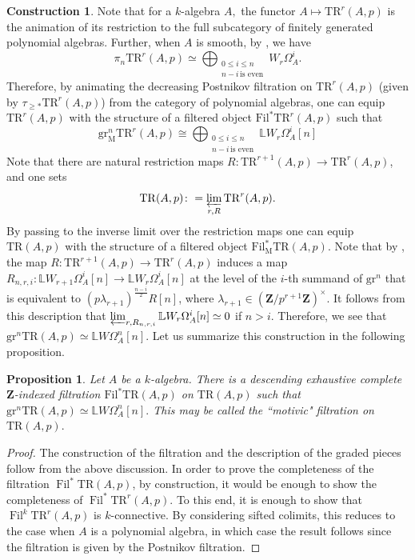 \documentclass[10pt,letterpaper]{amsart}
\numberwithin{figure}{section}
\numberwithin{equation}{section}
\newtheorem{proposition}[figure]{Proposition}
\theoremstyle{definition}
\theoremstyle{definition}
\theoremstyle{definition}
\theoremstyle{definition}
\newtheorem{construction}[figure]{Construction}
\DeclareMathOperator{\Fil}{Fil}
\newcommand{\w}{\text}
\newcommand{\TR}{\mathrm{TR}}
\renewcommand{\L}{\mathbb{L}}
\newcommand{\Z}{\mathbf{Z}}
\begin{document}
\begin{construction}\label{cons1}
    Note that for a $k$-algebra $A,$ the functor $A \mapsto \TR ^r (A,p)$ is the animation of its restriction to the full subcategory of finitely generated polynomial algebras. Further, when $A$ is smooth, by \cite[Thm.~B]{Hess}, we have
$$\pi_n \TR^r(A,p) \simeq \bigoplus_{\substack{0 \le i \le n\\ n-i\,\w{is even}}} W_r\Omega^i_A.$$ Therefore, by animating the decreasing Postnikov filtration on $\TR^r(A,p)$ (given by $\tau_{\ge *}\TR^r(A,p)$) from the category of polynomial algebras, one can equip $\TR^r(A,p)$ with the structure of a filtered object $\mathrm{Fil}^*_{\mathrm{}} \TR^r(A,p)$ such that 
\begin{equation}\label{eq1}
\mathrm{gr}^n_{\mathrm{M}} \TR^r(A,p) \cong
    \displaystyle{\bigoplus_{\substack{0 \le i \le n\\ n-i\,\w{is even}}}\L W_r\Omega^i_A[n]}
\end{equation}
Note that there are natural restriction maps $R\colon \TR^{r+1}(A,p) \to \TR^{r}(A,p)$, and one sets $$\TR (A,p) \colon= \varprojlim_{r,R} \TR^r(A,p).$$ By passing to the inverse limit over the restriction maps one can equip $\TR(A,p)$ with the structure of a filtered object $\mathrm{Fil}^*_{\mathrm{M}} \TR(A,p)$. Note that by \cite[Thm.~B]{Hess}, the map $R\colon \TR^{r+1}(A,p) \to \TR^{r}(A,p)$ induces a map $R_{n,r,i}\colon \L W_{r+1} \Omega^i_A[n] \to \L W_{r} \Omega^i_A [n]$ at the level of the $i$-th summand of $\mathrm{gr}^n$ that is equivalent to $(p \lambda_{r+1})^{\frac{n-i}{2}}R[n]$, where $\lambda_{r+1} \in (\Z/p^{r+1} \Z)^\times.$ It follows from this description that $\varprojlim _{r,R_{n,r,i}} \L W_{r}\Omega^i_A [n] \simeq 0$ if $n>i.$ Therefore, we see that $\mathrm{gr}^n \TR(A,p) \simeq \L W\Omega^n_A [n].$ Let us summarize this construction in the following proposition.
\end{construction}{}

\begin{proposition}\label{trr}
  Let $A$ be a $k$-algebra. There is a descending exhaustive complete $\Z$-indexed filtration $\mathrm{Fil}^* \TR(A,p)$ on $\TR(A,p)$ such that $\mathrm{gr}^n \TR(A,p) \simeq \L W\Omega^n_A [n].$ This may be called the ``motivic" filtration on $\TR(A,p).$
\end{proposition}{}

\begin{proof}
    The construction of the filtration and the description of the graded pieces follow from the above discussion. In order to prove the completeness of the filtration $\Fil^* \TR(A,p)$, by construction, it would be enough to show the completeness of $\Fil^*\TR^r (A,p).$ To this end, it is enough to show that $\Fil^k \TR^r(A,p)$ is $k$-connective. By considering sifted colimits, this reduces to the case when $A$ is a polynomial algebra, in which case the result follows since the filtration is given by the Postnikov filtration.
\end{proof}{}
\end{document}
